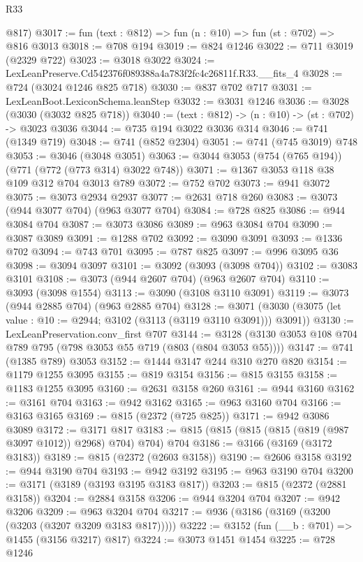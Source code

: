 \begin{lexlean}{R33}
\begin{coremodule}
      @817)
@3017 := fun (text : @812) => fun (n : @10) => fun (st : @702) => @816 @3013
@3018 := @708 @194
@3019 := @824 @1246
@3022 := @711 @3019 (@2329 @722)
@3023 := @3018 @3022
@3024 := LexLeanPreserve.Cd542376f089388a4a783f2fc4c26811f.R33.__fits_4
@3028 := @724 (@3024 @1246 @825 @718)
@3030 := @837 @702 @717
@3031 := LexLeanBoot.LexiconSchema.leanStep
@3032 := @3031 @1246
@3036 := @3028 (@3030 (@3032 @825 @718))
@3040 := (text : @812) -> (n : @10) -> (st : @702) -> @3023 @3036
@3044 := @735 @194 @3022 @3036 @314
@3046 := @741 (@1349 @719)
@3048 := @741 (@852 @2304)
@3051 := @741 (@745 @3019) @748
@3053 := @3046 (@3048 @3051)
@3063 := @3044 @3053 (@754 (@765 @194)) (@771 (@772 (@773 @314) @3022 @748))
@3071 := @1367 @3053 @118 @38 @109 @312 @704 @3013 @789
@3072 := @752 @702
@3073 := @941 @3072
@3075 := @3073 @2934 @2937
@3077 := @2631 @718 @260
@3083 := @3073 (@944 @3077 @704) (@963 @3077 @704)
@3084 := @728 @825
@3086 := @944 @3084 @704
@3087 := @3073 @3086
@3089 := @963 @3084 @704
@3090 := @3087 @3089
@3091 := @1288 @702
@3092 := @3090 @3091
@3093 := @1336 @702
@3094 := @743 @701
@3095 := @787 @825
@3097 := @996 @3095 @36
@3098 := @3094 @3097
@3101 := @3092 (@3093 (@3098 @704))
@3102 := @3083 @3101
@3108 := @3073 (@944 @2607 @704) (@963 @2607 @704)
@3110 := @3093 (@3098 @1554)
@3113 := @3090 (@3108 @3110 @3091)
@3119 := @3073 (@944 @2885 @704) (@963 @2885 @704)
@3128 := @3071 (@3030 (@3075 (let value : @10 := @2944; @3102 (@3113 (@3119 @3110 @3091))) @3091))
@3130 := LexLeanPreservation.conv_first @707
@3144 := @3128 (@3130 @3053 @108 @704 @789 @795 (@798 @3053 @55 @719 (@803 (@804 @3053 @55))))
@3147 := @741 (@1385 @789) @3053
@3152 := @1444 @3147 @244 @310 @270 @820
@3154 := @1179 @1255 @3095
@3155 := @819 @3154
@3156 := @815 @3155
@3158 := @1183 @1255 @3095
@3160 := @2631 @3158 @260
@3161 := @944 @3160
@3162 := @3161 @704
@3163 := @942 @3162
@3165 := @963 @3160 @704
@3166 := @3163 @3165
@3169 := @815 (@2372 (@725 @825))
@3171 := @942 @3086 @3089
@3172 := @3171 @817
@3183 := @815 (@815 (@815 (@815 (@819 (@987 @3097 @1012)) @2968) @704) @704) @704
@3186 := @3166 (@3169 (@3172 @3183))
@3189 := @815 (@2372 (@2603 @3158))
@3190 := @2606 @3158
@3192 := @944 @3190 @704
@3193 := @942 @3192
@3195 := @963 @3190 @704
@3200 := @3171 (@3189 (@3193 @3195 @3183 @817))
@3203 := @815 (@2372 (@2881 @3158))
@3204 := @2884 @3158
@3206 := @944 @3204 @704
@3207 := @942 @3206
@3209 := @963 @3204 @704
@3217 := @936 (@3186 (@3169 (@3200 (@3203 (@3207 @3209 @3183 @817)))))
@3222 := @3152 (fun (__b : @701) => @1455 (@3156 @3217) @817)
@3224 := @3073 @1451 @1454
@3225 := @728 @1246

\end{coremodule}
\end{lexlean}
